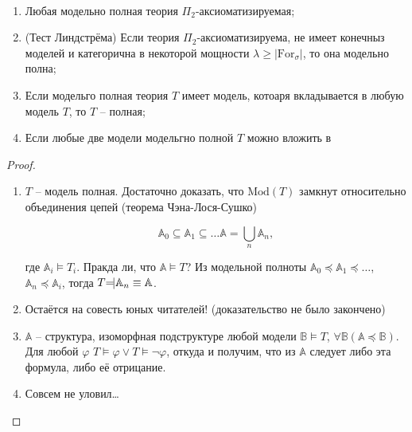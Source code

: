 \begin{prop} \ 

    \begin{enumerate}
        \item Любая модельно полная теория $\Pi_2$-аксиоматизируемая;
        \item (Тест Линдстрёма) Если теория $\Pi_2$-аксиоматизируема, не имеет конечныз моделей и категорична в некоторой мощности $\lambda \geq |\text{For}_\sigma|$, то она модельно полна; 
        \item Если модельго полная теория $T$ имеет модель, котоаря вкладывается в любую модель $T$, то $T$ -- полная; 
        \item Если любые две модели модельгно полной $T$ можно вложить в 
    \end{enumerate}
\end{prop}

\begin{proof} \

    \begin{enumerate}
        \item $T$ -- модель полная. Достаточно доказать, что $\text{Mod}(T)$ замкнут относительно объединения цепей (теорема Чэна-Лося-Сушко) 
         
        \[ 
            \mathbb{A}_0 \subseteq \mathbb{A}_1 \subseteq \ldots \mathbb{A} = \bigcup_n \mathbb{A}_n,
        \]

        где $\mathbb{A}_i \models T_i$. Пракда ли, что $\mathbb{A} \models T$? Из модельной полноты $\mathbb{A}_0 \preceq \mathbb{A}_1 \preceq \ldots$, $\mathbb{A}_n \preceq \mathbb{A}_i$, тогда $T \text{\rotatebox[origin=c]{180}{$\models$}} \mathbb{A}_n \equiv \mathbb{A}$. 

        \item Остаётся на совесть юных читателей! (доказательство не было закончено)
        \item $\mathbb{A}$ -- структура, изоморфная подструктуре любой модели $\mathbb{B} \models T$, $\forall \mathbb{B} (\mathbb{A} \preceq \mathbb{B})$. Для любой $\varphi$ $T \models \varphi \vee T \models \neg \varphi$, откуда и получим, что из $\mathbb{A}$ следует либо эта формула, либо её отрицание. 
        \item Совсем не уловил\ldots 
    \end{enumerate}
\end{proof}